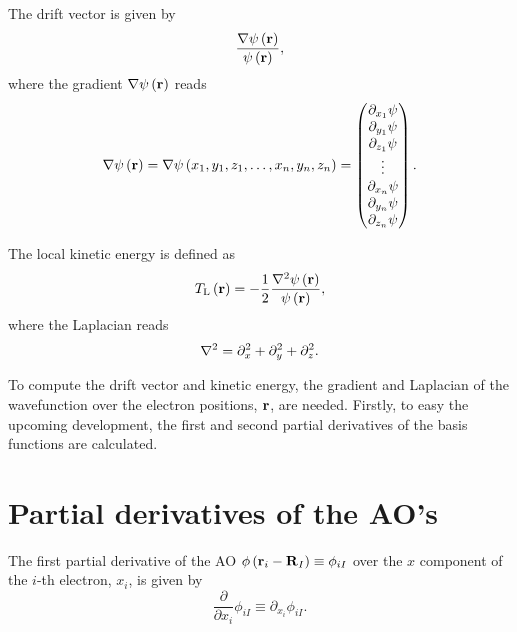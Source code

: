 The drift vector is given by 
\begin{equation} \label{eq:definition-drift-vector}
    \frac{
        \nabla \psi \left( \boldsymbol{\mathrm{r}} \right)
    }{
        \psi \left( \boldsymbol{\mathrm{r}} \right)
    }
    ,
\end{equation}
where the gradient $\nabla \psi \left( \boldsymbol{\mathrm{r}} \right)$ reads
\begin{equation} \label{eq:definition-gradient}
    \nabla
    \psi \left( \boldsymbol{\mathrm{r}} \right)
    =
    \nabla
    \psi \left( x_1, y_1, z_1, \ldots, x_n, y_n, z_n \right)
    =
    \begin{pmatrix}
        \partial_{x_1} \psi \\
        \partial_{y_1} \psi \\
        \partial_{z_1} \psi \\
        \vdots \\
        \partial_{x_n} \psi \\
        \partial_{y_n} \psi \\
        \partial_{z_n} \psi
    \end{pmatrix}
    .
\end{equation}

The local kinetic energy is defined as 
\begin{equation} \label{eq:definition-kinetic-energy}
    T_{\mathrm{L}} \left( \mat{r} \right)
    =
    - \frac{1}{2} \frac{\laplacian \psi \left( \mat{r} \right)}{\psi \left( \mat{r} \right)}
    ,
\end{equation}
where the Laplacian reads
\begin{equation} \label{eq:definition-laplacian}
    \laplacian 
    =
    \partial_x^{2} + \partial_y^{2} + \partial_z^{2}
    .
\end{equation}

To compute the drift vector and kinetic energy, the gradient and Laplacian of
the wavefunction over the electron positions, $ \boldsymbol{\mathrm{r}}$, are needed.
Firstly, to easy the upcoming development, the first and second partial 
derivatives of the basis functions are calculated.

\section{Partial derivatives of the AO's}
The first partial derivative of the AO
$\phi \left( \boldsymbol{\mathrm{r}}_i - \boldsymbol{\mathrm{R}}_I \right) \equiv \phi_{iI}$
over the $x$ component of the $i$-th
electron, $x_i$, is given by 
\begin{equation}
    \frac{\partial}{\partial x_i} \phi_{iI}
    \equiv
    \partial_{x_i} \phi_{iI}
    .
\end{equation}

